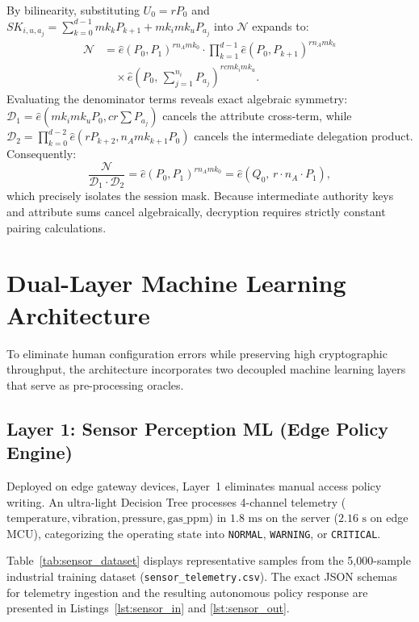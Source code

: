\documentclass[conference]{IEEEtran}
\begin{document}
\begin{IEEEproof}
By bilinearity, substituting $U_0 = r P_0$ and $SK_{i,u,a_j} = \sum_{k=0}^{d-1} mk_k P_{k+1} + mk_i mk_u P_{a_j}$ into $\mathcal{N}$ expands to:
\begin{align}
  \mathcal{N} &= \hat{e}(P_0, P_1)^{r n_A mk_0} \cdot \prod_{k=1}^{d-1} \hat{e}(P_0, P_{k+1})^{r n_A mk_k} \nonumber \\
  &\quad \times \hat{e}\left( P_0,\, \sum_{j=1}^{n_i} P_{a_j} \right)^{r c mk_i mk_u}.
\end{align}
Evaluating the denominator terms reveals exact algebraic symmetry:
$\mathcal{D}_1 = \hat{e}(mk_i mk_u P_0, c r \sum P_{a_j})$ cancels the attribute cross-term, while $\mathcal{D}_2 = \prod_{k=0}^{d-2} \hat{e}(r P_{k+2}, n_A mk_{k+1} P_0)$ cancels the intermediate delegation product. Consequently:
\begin{equation}
  \frac{\mathcal{N}}{\mathcal{D}_1 \cdot \mathcal{D}_2} = \hat{e}(P_0, P_1)^{r n_A mk_0} = \hat{e}(Q_0,\, r \cdot n_A \cdot P_1),
\end{equation}
which precisely isolates the session mask. Because intermediate authority keys and attribute sums cancel algebraically, decryption requires strictly constant pairing calculations.
\end{IEEEproof}

\section{Dual-Layer Machine Learning Architecture}
To eliminate human configuration errors while preserving high cryptographic throughput, the architecture incorporates two decoupled machine learning layers that serve as pre-processing oracles.

\subsection{Layer 1: Sensor Perception ML (Edge Policy Engine)}
Deployed on edge gateway devices, Layer~1 eliminates manual access policy writing. An ultra-light Decision Tree processes 4-channel telemetry ($\text{temperature}, \text{vibration}, \text{pressure}, \text{gas\_ppm}$) in $1.8\text{ ms}$ on the server ($2.16\text{ s}$ on edge MCU), categorizing the operating state into \texttt{NORMAL}, \texttt{WARNING}, or \texttt{CRITICAL}.

Table~\ref{tab:sensor_dataset} displays representative samples from the 5,000-sample industrial training dataset (\texttt{sensor\_telemetry.csv}). The exact JSON schemas for telemetry ingestion and the resulting autonomous policy response are presented in Listings~\ref{lst:sensor_in} and \ref{lst:sensor_out}.
\end{document}
